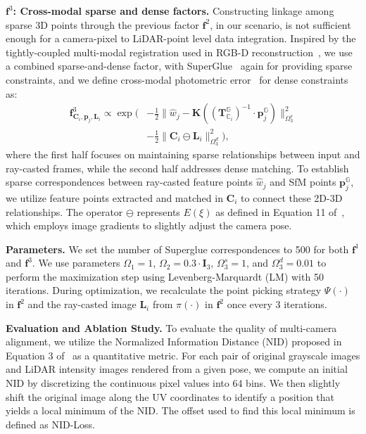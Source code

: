 \textbf{$\mathbf{f}^3$: Cross-modal sparse and dense factors.} Constructing linkage among sparse 3D points through the previous factor $\mathbf{f}^2$, in our scenario, is not sufficient enough for a camera-pixel to LiDAR-point level data integration. Inspired by the tightly-coupled multi-modal registration used in RGB-D reconstruction~\cite{dai2017bundlefusion}, we use a combined sparse-and-dense factor, with SuperGlue~\cite{wang2019superglue} again for providing sparse constraints, and we define cross-modal photometric error~\cite{stein2011densepholoss} for dense constraints as:
%
\begin{align}
  \mathbf{f}_{\mathbf{C}_i, \mathbf{p}_j, \mathbf{L}_i}^{3} \propto \exp(
  &-\frac{1}{2} \| \hat{w}_j - \mathbf{K} ((\mathbf{T}_{\mathbb{C}_i}^\mathbb{G})^{-1} \cdot \mathbf{p}_j^\mathbb{G} ) \|_{\Omega_3^s}^2 \\
  &-\frac{1}{2} \|
  \mathbf{C}_i \ominus \mathbf{L}_i \|_{\Omega_3^d}^2 ),
\label{equ:sfm3}
\end{align}
%
where the first half focuses on maintaining sparse relationships between input and ray-casted frames, while the second half addresses dense matching. To establish sparse correspondences between ray-casted feature points $\hat{w}_j$ and SfM points $\mathbf{p}_j^\mathbb{G}$, we utilize feature points extracted and matched in $\mathbf{C}_i$ to connect these 2D-3D relationships. The operator $\ominus$ represents $E(\xi)$ as defined in Equation 11 of~\cite{stein2011densepholoss}, which employs image gradients to slightly adjust the camera pose.

{\textbf{Parameters.}
We set the number of Superglue correspondences to 500 for both $\mathbf{f}^1$ and $\mathbf{f}^3$. We use parameters $\Omega_1 = 1$, $\Omega_2 = 0.3 \cdot \mathbf{I}_3$, $\Omega_3^s = 1$, and $\Omega_3^d = 0.01$ to perform the maximization step using Levenberg-Marquardt (LM) with 50 iterations. During optimization, we recalculate the point picking strategy $\Psi(\cdot)$ in $\mathbf{f}^2$ and the ray-casted image $\mathbf{L}_i$ from $\pi(\cdot)$ in $\mathbf{f}^2$ once every 3 iterations.}

\textbf{Evaluation and Ablation Study.} To evaluate the quality of multi-camera alignment, we utilize the Normalized Information Distance (NID) proposed in Equation 3 of~\cite{pascoe2015robust} as a quantitative metric. For each pair of original grayscale images and LiDAR intensity images rendered from a given pose, we compute an initial NID by discretizing the continuous pixel values into 64 bins. We then slightly shift the original image along the UV coordinates to identify a position that yields a local minimum of the NID. The offset used to find this local minimum is defined as NID-Loss.

